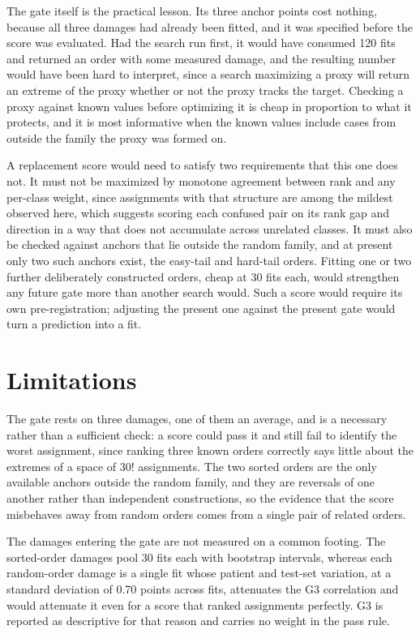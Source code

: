 The gate itself is the practical lesson. Its three anchor points cost nothing, because all three damages had already been fitted, and it was specified before the score was evaluated. Had the search run first, it would have consumed 120 fits and returned an order with some measured damage, and the resulting number would have been hard to interpret, since a search maximizing a proxy will return an extreme of the proxy whether or not the proxy tracks the target. Checking a proxy against known values before optimizing it is cheap in proportion to what it protects, and it is most informative when the known values include cases from outside the family the proxy was formed on.

A replacement score would need to satisfy two requirements that this one does not. It must not be maximized by monotone agreement between rank and any per-class weight, since assignments with that structure are among the mildest observed here, which suggests scoring each confused pair on its rank gap and direction in a way that does not accumulate across unrelated classes. It must also be checked against anchors that lie outside the random family, and at present only two such anchors exist, the easy-tail and hard-tail orders. Fitting one or two further deliberately constructed orders, cheap at 30 fits each, would strengthen any future gate more than another search would. Such a score would require its own pre-registration; adjusting the present one against the present gate would turn a prediction into a fit.

\section{Limitations}
\label{sec:limitations}
The gate rests on three damages, one of them an average, and is a necessary rather than a sufficient check: a score could pass it and still fail to identify the worst assignment, since ranking three known orders correctly says little about the extremes of a space of $30!$ assignments. The two sorted orders are the only available anchors outside the random family, and they are reversals of one another rather than independent constructions, so the evidence that the score misbehaves away from random orders comes from a single pair of related orders.

The damages entering the gate are not measured on a common footing. The sorted-order damages pool 30 fits each with bootstrap intervals, whereas each random-order damage is a single fit whose patient and test-set variation, at a standard deviation of 0.70 points across fits, attenuates the G3 correlation and would attenuate it even for a score that ranked assignments perfectly. G3 is reported as descriptive for that reason and carries no weight in the pass rule.

